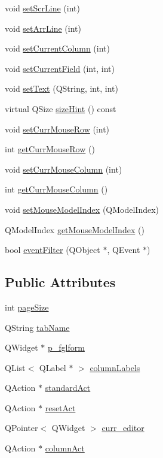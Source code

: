 \begin{DoxyCompactItemize}
void \hyperlink{classTableView_ac961015fe4c7fe1c5af03035db501400}{setScrLine} (int)
\item 
void \hyperlink{classTableView_a9579368ee0b02a654fc5f68ff504a83f}{setArrLine} (int)
\item 
void \hyperlink{classTableView_a51769748b8e61de5f2e118ff5df32887}{setCurrentColumn} (int)
\item 
void \hyperlink{classTableView_a245773b2b9426d4e354cf55fff770aa8}{setCurrentField} (int, int)
\item 
void \hyperlink{classTableView_abe0f2fa077f2d14e7e14f6cfcad09bd6}{setText} (QString, int, int)
\item 
virtual QSize \hyperlink{classTableView_a448f34f348c812c632d5e33b7f6987a0}{sizeHint} () const 
\item 
void \hyperlink{classTableView_ae672b410481126e82682273afd28ccdb}{setCurrMouseRow} (int)
\item 
int \hyperlink{classTableView_a4c4cd480a0979197e2b96e6b03fa0213}{getCurrMouseRow} ()
\item 
void \hyperlink{classTableView_ae927aad90eebbc37f4429ec40393a175}{setCurrMouseColumn} (int)
\item 
int \hyperlink{classTableView_af23a2d29fe926816fc8d42f11ea57a38}{getCurrMouseColumn} ()
\item 
void \hyperlink{classTableView_a54c133e2fe1893644c9996694c075ed2}{setMouseModelIndex} (QModelIndex)
\item 
QModelIndex \hyperlink{classTableView_ae777b72755652714896a7b45b96bb2da}{getMouseModelIndex} ()
\item 
bool \hyperlink{classTableView_a119f899686b60f0c3d0a910b65e2daa8}{eventFilter} (QObject $\ast$, QEvent $\ast$)
\end{DoxyCompactItemize}
\subsection*{Public Attributes}
\begin{DoxyCompactItemize}
\item 
int \hyperlink{classTableView_abb4a46ca1492e88b8fe2fa9b68595340}{pageSize}
\item 
QString \hyperlink{classTableView_aa26e19998b21b401d0f7b4c703a7c91d}{tabName}
\item 
QWidget $\ast$ \hyperlink{classTableView_a1d048152ea82f3f8d33e538cb032b37b}{p\_\-fglform}
\item 
QList$<$ QLabel $\ast$ $>$ \hyperlink{classTableView_a1160d50c2fd480dfd59b3d7660ef17b0}{columnLabels}
\item 
QAction $\ast$ \hyperlink{classTableView_a24e6725afbdbe0fded4ee3409fc877a7}{standardAct}
\item 
QAction $\ast$ \hyperlink{classTableView_a513618ab0a9e4a3048ab617b68ba4409}{resetAct}
\item 
QPointer$<$ QWidget $>$ \hyperlink{classTableView_a294454aaf1b1d44841f39bc28527d93c}{curr\_\-editor}
\item 
QAction $\ast$ \hyperlink{classTableView_a1808f7915f3db4bdea5fb535ecebda52}{columnAct}
\end{DoxyCompactItemize}
